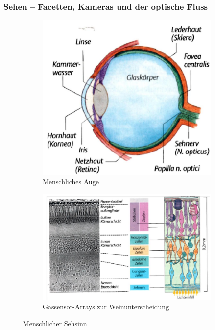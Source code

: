 \subsubsection{Sehen – Facetten, Kameras und der optische Fluss}
\begin{figure}[h!]
	\begin{subfigure}{.31\textwidth}
		\includegraphics[width=\linewidth]{figures/ch04_auge.png}
		\caption{Menschliches Auge}
		\label{auge}
	\end{subfigure}
	\begin{subfigure}{.5\textwidth}
		\includegraphics[width=\linewidth]{figures/ch04_netzhaut.png}
		\caption{Gassensor-Arrays zur Weinunterscheidung}
		\label{netzhaut}
	\end{subfigure}
	\caption{Menschlicher Sehsinn}
\end{figure}
